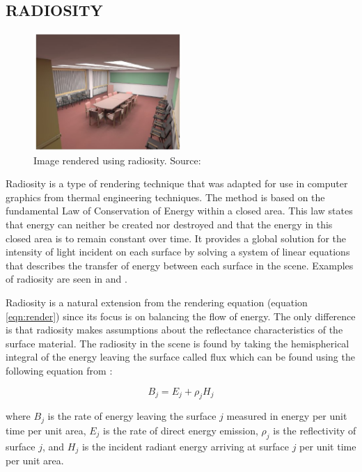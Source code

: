 \subsection{RADIOSITY}

\begin{figure}[h!]
  \centering
    \includegraphics[width=0.5\textwidth]{radiositySample.jpg}
  \caption{Image rendered using radiosity. Source: \protect\cite{Keller1997}}
	\label{fig:radiositySample}
\end{figure}

Radiosity is a type of rendering technique that was adapted for use in computer graphics from thermal engineering techniques.  The method is based on the fundamental Law of Conservation of Energy within a closed area.  This law states that energy can neither be created nor destroyed and that the energy in this closed area is to remain constant over time.  It provides a global solution for the intensity of light incident on each surface by solving a system of linear equations that describes the transfer of energy between each surface in the scene.  Examples of radiosity are seen in \cite{Immel1986} and \cite{Goral1984}.

Radiosity is a natural extension from the rendering equation (equation \ref{eqn:render}) since its focus is on balancing the flow of energy.  The only difference is that radiosity makes assumptions about the reflectance characteristics of the surface material.  The radiosity in the scene is found by taking the hemispherical integral of the energy leaving the surface called flux which can be found using the following equation from \cite{Goral1984}:

\begin{equation}
B_{j} = E_{j} + \rho_{j}H_{j} \label{eqn:radiosity1}
\end{equation}

where $B_{j}$ is the rate of energy leaving the surface $j$ measured in energy per unit time per unit area, $E_{j}$ is the rate of direct energy emission,  $\rho_{j}$ is the reflectivity of surface $j$, and $H_{j}$ is the incident radiant energy arriving at surface $j$ per unit time per unit area.

